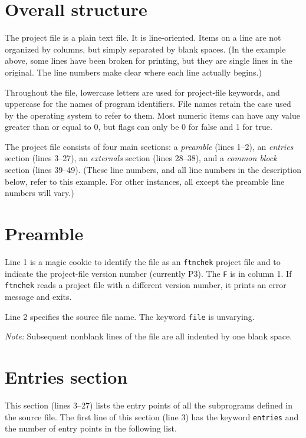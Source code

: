 \documentclass{article}
\begin{document}
\section{Overall structure}
The project file is a plain text file.  It is line-oriented.  Items
on a line are not organized by columns, but simply separated by blank
spaces.  (In the example above, some lines have been broken for
printing, but they are single lines in the original.  The line numbers
make clear where each line actually begins.)

Throughout the file, lowercase letters are used for project-file
keywords, and uppercase for the names of program identifiers.  File
names retain the case used by the operating system to refer to them.
Most numeric items can have any value greater than or equal to 0, but
flags can only be 0 for false and 1 for true.

The project file consists of four main sections: a {\em preamble}
(lines 1--2), an {\em entries} section (lines 3--27), an {\em
externals} section (lines 28--38), and a {\em common block} section
(lines 39--49).
(These line numbers, and all line numbers in the description below,
refer to this example.  For other instances, all except the preamble
line numbers will vary.)

\section{Preamble}
Line 1 is a magic cookie to identify the file as an {\tt ftnchek}
project file and to indicate the project-file version number
(currently P3).  The {\tt F} is in column 1.
If {\tt ftnchek} reads a project file with a different
version number, it prints an error message and exits.

Line 2 specifies the source file name.  The keyword {\tt file} is
unvarying.

{\em Note:} Subsequent nonblank lines of the file are all indented by one
blank space.

\section{Entries section}
This section (lines 3--27) lists the entry points of all the
subprograms defined in the source file.  The first line of this
section (line 3) has the keyword {\tt entries} and the number of entry
points in the following list.
\end{document}
